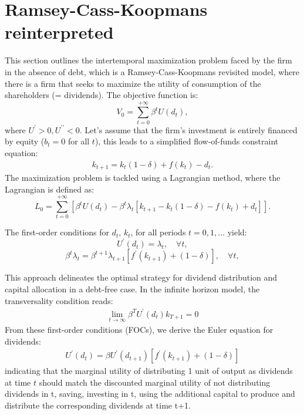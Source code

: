 \documentclass[12pt]{report}
\begin{document}
\section{Ramsey-Cass-Koopmans reinterpreted}
This section outlines the intertemporal maximization problem faced by the firm in the absence of debt, which is a
Ramsey-Cass-Koopmans revisited model, where there is a firm that seeks to maximize the utility of consumption of the
shareholders (= dividends).
The objective function is:
\[V_0 = \sum_{t=0}^{+\infty}{\beta^t U(d_t)},\]
where \(U^{\prime}>0, U^{\prime \prime}<0\).
Let's assume that the firm's investment is entirely financed by equity (\(b_t=0\)  for all \(t\)), this leads to a simplified flow-of-funds constraint equation:
\begin{align}
    k_{t+1} = k_{t}(1 - \delta) + f(k_{t}) - d_{t}.  \label{eq13}
\end{align}
The maximization problem is tackled using a Lagrangian method, where the Lagrangian is defined as:
\[L_0 = \sum_{t=0}^{+\infty}\left[{\beta^t U(d_t) - \beta^t \lambda_t\left[k_{t+1} - k_{t}(1 - \delta) - f(k_t) + d_t\right]}\right].\]

The first-order conditions for \(d_{t}\), \(k_{t}\), for all periods \(t=0,1,\ldots\) yield:
\[
U^{\prime}(d_{t}) = \lambda_t, \quad \forall t,
\]
\[
\beta^t \lambda_t = \beta^{t+1} \lambda_{t+1}[f^{\prime}(k_{t+1}) + (1-\delta)], \quad \forall t,
\]


This approach delineates the optimal strategy for dividend distribution and capital allocation in a debt-free
case.
In the infinite horizon model, the transversality condition reads:
\begin{align}
    \lim _{t \rightarrow \infty} \beta^T U^{\prime}\left(d_{t}\right) k_{T+1}=0 \label{eq26}
\end{align}
From these first-order conditions (FOCs), we derive the Euler equation for dividends:
\begin{align}
    U^{\prime}(d_{t}) = \beta U^{\prime}(d_{t+1})[f^{\prime}(k_{t+1}) + (1-\delta)]  \label{eq14}
\end{align}
indicating that the marginal utility of distributing 1 unit of output as dividends at time \(t\) should match the discounted marginal
utility of not distributing  dividends in t, saving, investing in t, using the additional capital to produce and
distribute the corresponding dividends at time t+1.
\end{document}
